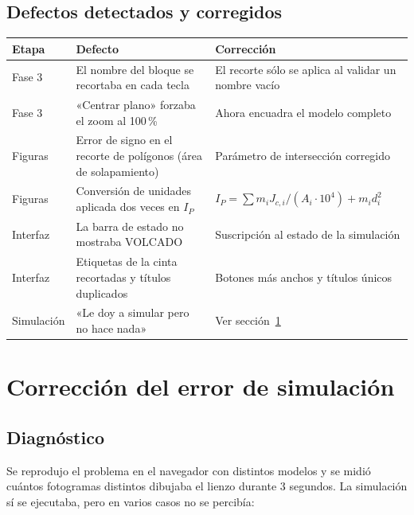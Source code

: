 \documentclass[11pt,a4paper]{article}
\begin{document}
\subsection{Defectos detectados y corregidos}
\begin{center}
\small
\begin{tabularx}{\textwidth}{L{2.4cm}YY}
\toprule
\textbf{Etapa} & \textbf{Defecto} & \textbf{Corrección}\\
\midrule
Fase 3 & El nombre del bloque se recortaba en cada tecla & El recorte sólo se aplica al validar un nombre vacío\\
Fase 3 & «Centrar plano» forzaba el zoom al 100\,\% & Ahora encuadra el modelo completo\\
Figuras & Error de signo en el recorte de polígonos (área de solapamiento) & Parámetro de intersección corregido\\
Figuras & Conversión de unidades aplicada dos veces en $I_P$ & $I_P=\sum m_i J_{c,i}/(A_i\cdot 10^4)+m_i d_i^2$\\
Interfaz & La barra de estado no mostraba VOLCADO & Suscripción al estado de la simulación\\
Interfaz & Etiquetas de la cinta recortadas y títulos duplicados & Botones más anchos y títulos únicos\\
Simulación & «Le doy a simular pero no hace nada» & Ver sección~\ref{sec:sim}\\
\bottomrule
\end{tabularx}
\end{center}

\section{Corrección del error de simulación}\label{sec:sim}

\subsection{Diagnóstico}
Se reprodujo el problema en el navegador con distintos modelos y se midió cuántos fotogramas distintos
dibujaba el lienzo durante 3 segundos. La simulación sí se ejecutaba, pero en varios casos no se percibía:
\end{document}

